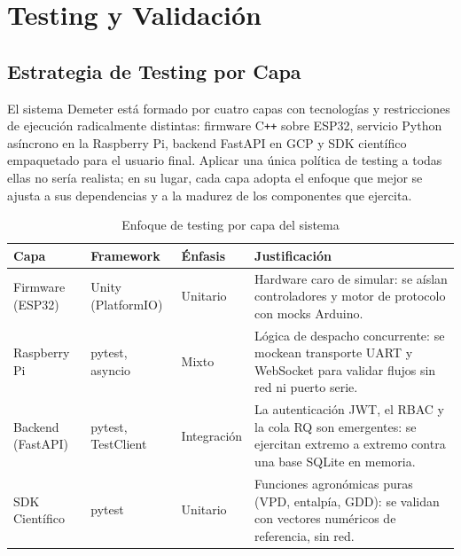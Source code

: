 \chapter{Testing y Validación}
\label{sec:testing}

\section{Estrategia de Testing por Capa}

El sistema Demeter está formado por cuatro capas con tecnologías y restricciones de
ejecución radicalmente distintas: firmware C\texttt{++} sobre ESP32, servicio Python
asíncrono en la Raspberry Pi, backend FastAPI en GCP y SDK científico empaquetado para
el usuario final. Aplicar una única política de testing a todas ellas no sería
realista; en su lugar, cada capa adopta el enfoque que mejor se ajusta a sus
dependencias y a la madurez de los componentes que ejercita.

\begin{table}[H]
    \centering
    \caption{Enfoque de testing por capa del sistema}
    \begin{tabularx}{\textwidth}{lllX}
        \toprule
        \textbf{Capa}            & \textbf{Framework}      & \textbf{Énfasis}     & \textbf{Justificación} \\
        \midrule
        Firmware (ESP32)         & Unity (PlatformIO)      & Unitario             & Hardware caro de simular: se aíslan controladores y motor de protocolo con mocks Arduino. \\
        Raspberry Pi             & pytest, asyncio         & Mixto                & Lógica de despacho concurrente: se mockean transporte UART y WebSocket para validar flujos sin red ni puerto serie. \\
        Backend (FastAPI)        & pytest, TestClient      & Integración           & La autenticación JWT, el RBAC y la cola RQ son emergentes: se ejercitan extremo a extremo contra una base SQLite en memoria. \\
        SDK Científico           & pytest                  & Unitario              & Funciones agronómicas puras (VPD, entalpía, GDD): se validan con vectores numéricos de referencia, sin red. \\
        \bottomrule
    \end{tabularx}
    \label{tab:test_strategy}
\end{table}

